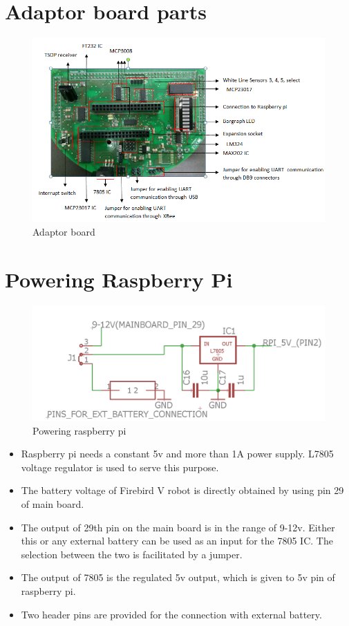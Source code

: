 \documentclass[a4paper,12pt,oneside]{book}
\begin{document}
\section{\textbf{Adaptor board parts}}
\begin{figure}[h]
	\includegraphics[width=1.1\textwidth]{Adaptor_board}
	\caption{Adaptor board}
\end{figure}
\pagebreak

\section{\textbf{Powering Raspberry Pi}}
\begin{figure}[h]

	\includegraphics[width=1.\textwidth]{rpi_power}
	\caption{Powering raspberry pi}
\end{figure}
\hfill
\begin{itemize}
	\item{Raspberry pi needs a constant 5v and more than 1A power supply. L7805 voltage regulator is used to serve this purpose.}
	\item {The battery voltage of Firebird V robot is directly obtained by using pin 29 of main board.}
	\item {The output of 29th pin on the main board is in the range of 9-12v. Either this or any external battery can be used as an input for the 7805 IC. The selection between the two is facilitated by a jumper.}
	\item {The output of 7805 is the regulated 5v output, which is given to 5v pin of raspberry pi.}
	\item {Two header pins are provided for the connection with external battery.}
\end{itemize}
\pagebreak
\end{document}
